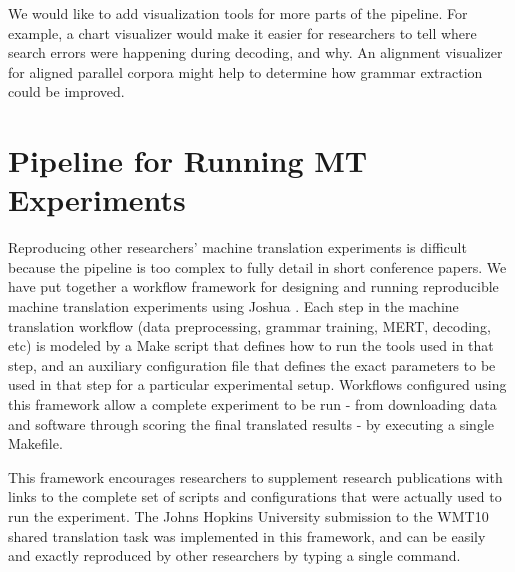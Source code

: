 \documentclass[11pt]{article}
\begin{document}
We would like to add visualization tools for more parts of the pipeline. For
example, a chart visualizer would make it easier for researchers to tell where
search errors were happening during decoding, and why. An alignment visualizer
for aligned parallel corpora might help to determine how grammar extraction 
could be improved.


\section{Pipeline for Running MT Experiments}

Reproducing other researchers' machine translation experiments is difficult because the pipeline is too complex to fully detail in short conference papers. We have put together a workflow framework for designing and running reproducible machine translation experiments using Joshua . Each step in the machine translation workflow (data preprocessing, grammar training, MERT, decoding, etc) is modeled by a Make script that defines how to run the tools used in that step, and an auxiliary configuration file that defines the exact parameters to be used in that step for a particular experimental setup. Workflows configured using this framework allow a complete experiment to be run - from downloading data and software through scoring the final translated results - by executing a single Makefile.

This framework encourages researchers to supplement research publications with links to the complete set of scripts and configurations that were actually used to run the experiment. The Johns Hopkins University submission to the WMT10 shared translation task was implemented in this framework, and can be easily and exactly reproduced by other researchers by typing a single command. 


\end{document}
